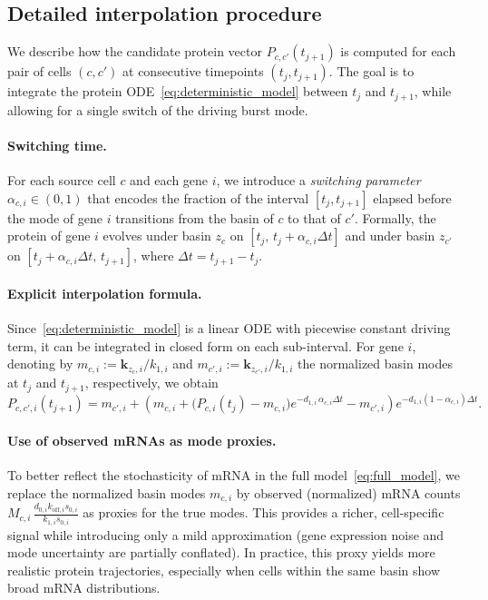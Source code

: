 \documentclass[a4paper, 11pt]{article}
\theoremstyle{plain}
\theoremstyle{remark}
\begin{document}
\begin{appendices}

\section{Detailed interpolation procedure}
\label{app_detailed_interpolation}

We describe how the candidate protein vector $P_{c,c'}(t_{j+1})$ is computed for each pair of cells $(c, c')$ at consecutive timepoints $(t_j, t_{j+1})$. The goal is to integrate the protein ODE~\eqref{eq:deterministic_model} between $t_j$ and $t_{j+1}$, while allowing for a single switch of the driving burst mode.

\paragraph{Switching time.}
For each source cell $c$ and each gene $i$, we introduce a \emph{switching parameter} $\alpha_{c,i} \in (0,1)$ that encodes the fraction of the interval $[t_j, t_{j+1}]$ elapsed before the mode of gene $i$ transitions from the basin of $c$ to that of $c'$. Formally, the protein of gene $i$ evolves under basin $z_c$ on $[t_j,\, t_j + \alpha_{c,i}\Delta t]$ and under basin $z_{c'}$ on $[t_j + \alpha_{c,i}\Delta t,\, t_{j+1}]$, where $\Delta t = t_{j+1} - t_j$.

\paragraph{Explicit interpolation formula.}
Since~\eqref{eq:deterministic_model} is a linear ODE with piecewise constant driving term, it can be integrated in closed form on each sub-interval. For gene $i$, denoting by $m_{c,i}:=\mathbf{k}_{z_c,i}/k_{1,i}$ and $m_{c',i}:=\mathbf{k}_{z_{c'},i}/k_{1,i}$ the normalized basin modes at $t_j$ and $t_{j+1}$, respectively, we obtain
\begin{equation}
\label{eq:interp_simple}
P_{c,c',i}(t_{j+1}) = m_{c',i} + \left(m_{c,i} + \bigl(P_{c,i}(t_j) - m_{c,i}\bigr)e^{-d_{1,i}\,\alpha_{c,i}\Delta t} - m_{c',i}\right)e^{-d_{1,i}(1-\alpha_{c,i})\Delta t}.
\end{equation}

\paragraph{Use of observed mRNAs as mode proxies.}
To better reflect the stochasticity of mRNA in the full model~\eqref{eq:full_model}, we replace the normalized basin modes $m_{c,i}$ by observed (normalized) mRNA counts $M_{c,i}\,\frac{d_{0, i} k_{\mathrm{off}, i}s_{0,i}}{k_{1,i}s_{0,i}}$ as proxies for the true modes. This provides a richer, cell-specific signal while introducing only a mild approximation (gene expression noise and mode uncertainty are partially conflated). In practice, this proxy yields more realistic protein trajectories, especially when cells within the same basin show broad mRNA distributions.


\end{appendices}
\end{document}
